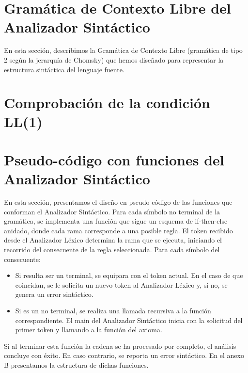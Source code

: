 \documentclass{article}
\begin{document}
\newpage

\section{Gramática de Contexto Libre del Analizador Sintáctico}

En esta sección, describimos la Gramática de Contexto Libre (gramática de tipo 2 según la jerarquía de Chomsky) que hemos diseñado para representar la estructura sintáctica del lenguaje fuente.



\newpage

\section{Comprobación de la condición LL(1)}



\section{Pseudo-código con funciones del Analizador Sintáctico}

En esta sección, presentamos el diseño en pseudo-código de las funciones que conforman el Analizador Sintáctico. Para cada símbolo no terminal de la gramática, se implementa una función que sigue un esquema de if-then-else anidado, donde cada rama corresponde a una posible regla. El token recibido desde el Analizador Léxico determina la rama que se ejecuta, iniciando el recorrido del consecuente de la regla seleccionada. Para cada símbolo del consecuente:

\begin{itemize}
    \item Si resulta ser un terminal, se equipara con el token actual. En el caso de que coincidan, se le solicita un nuevo token al Analizador Léxico y, si no, se genera un error sintáctico. 
    \item Si es un no terminal, se realiza una llamada recursiva a la función correspondiente. El main del Analizador Sintáctico inicia con la solicitud del primer token y llamando a la función del axioma. 
\end{itemize}

Si al terminar esta función la cadena se ha procesado por completo, el análisis concluye con éxito. En caso contrario, se reporta un error sintáctico. En el anexo B presentamos la estructura de dichas funciones.
\end{document}
